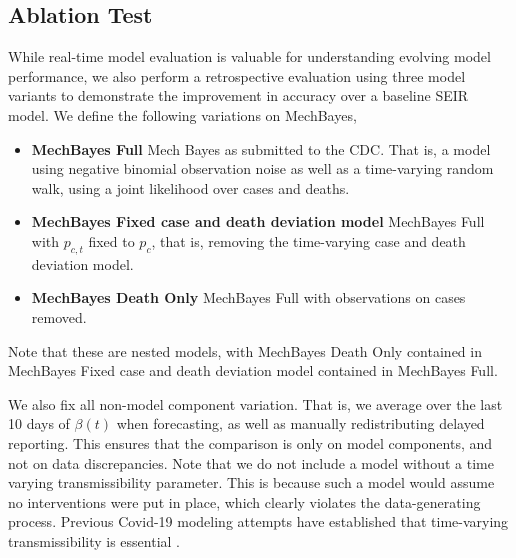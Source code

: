 \documentclass{umassthesis}          %
\begin{document}
 
 \subsection{Ablation Test}
 
 While real-time model evaluation is valuable for understanding evolving model performance, we also perform a retrospective evaluation using three model variants to demonstrate the improvement in accuracy over a baseline SEIR model. We define the following variations on MechBayes,
 
 \begin{itemize}
 \item \textbf{MechBayes Full} Mech Bayes as submitted to the CDC. That is, a model using negative binomial observation noise as well as a time-varying random walk, using a joint likelihood over cases and deaths.
 
 \item \textbf{MechBayes Fixed case and death deviation model} MechBayes Full with $p_{c,t}$ fixed to $p_c$, that is, removing the time-varying case and death deviation model.
 
 \item \textbf{MechBayes Death Only} MechBayes Full with observations on cases removed.
 \end{itemize}
 
 Note that these are nested models, with MechBayes Death Only contained in MechBayes Fixed case and death deviation model contained in MechBayes Full. 
 
  
 We also fix all non-model component variation. That is, we average over the last 10 days of $\beta(t)$ when forecasting, as well as manually redistributing delayed reporting. This ensures that the comparison is only on model components, and not on data discrepancies. Note that we do not include a model without a time varying transmissibility parameter. This is because such a model would assume no interventions were put in place, which clearly violates the data-generating process. Previous Covid-19 modeling attempts have established that time-varying transmissibility is essential \cite{pei2020differential} \cite{abbott2020estimating}\cite{flaxman2020estimating} \cite{smirnova2019forecasting}.
\end{document}
